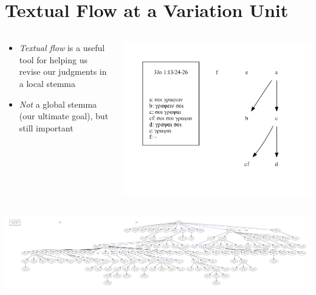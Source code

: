 \documentclass[10pt]{beamer}
\begin{document}
	\section*{Textual Flow at a Variation Unit}
	\begin{frame}
		\begin{columns}
			\begin{column}{0.45\textwidth}
				\begin{itemize}
					\item \emph{Textual flow} is a useful tool for helping us revise our judgments in a local stemma
					\item \emph{Not} a global stemma (our ultimate goal), but still important
				\end{itemize}
			\end{column}
			\begin{column}{0.45\textwidth}
				\begin{center}
					\includegraphics[width=\textwidth]{../img/B25K1V13U24-26-local-stemma-incomplete.pdf}
				\end{center}
			\end{column}
		\end{columns}
		\begin{center}
			\includegraphics[width=\textwidth]{../img/B25K1V13U24-26-textual-flow.pdf}
		\end{center}
	\end{frame}
\end{document}
